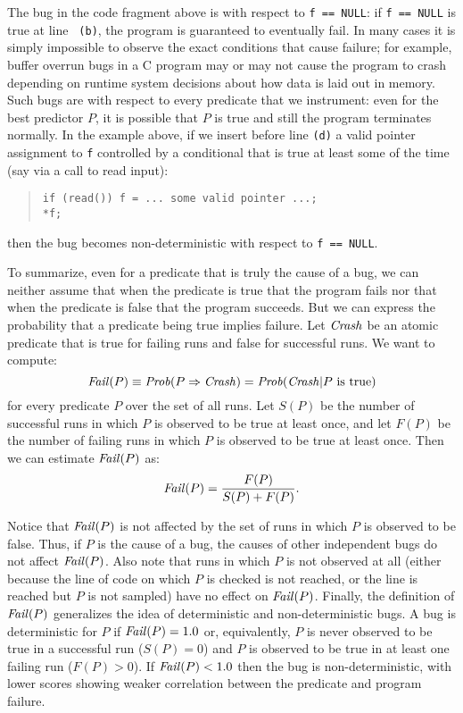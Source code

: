 The bug in the code fragment above is  with
respect to {\tt f == NULL}: if {\tt f == NULL} is true at line {\tt
(b)}, the program is guaranteed to eventually fail.  In many cases it
is simply impossible to observe the exact conditions that cause
failure; for example, buffer overrun bugs in a C program may or may
not cause the program to crash depending on runtime system decisions
about how data is laid out in memory.  Such bugs are
 with respect to every predicate that we instrument:
even for the best predictor $P$, it is possible that $P$ is true and
still the program terminates normally.  In the example above, if we insert before line
{\tt (d)} a valid pointer  assignment to {\tt f} controlled by a conditional that is true
at least some of the time (say via a call to read input):
\begin{quote}
\begin{verbatim}
if (read()) f = ... some valid pointer ...;
*f;
\end{verbatim}
\end{quote}
then the bug becomes non-deterministic with respect to {\tt f == NULL}.

To summarize, even for a predicate that is truly the cause of a bug, we can neither assume that
when the predicate is true that
the program fails nor that when the predicate is false that
the program succeeds. But we can express the probability that a predicate
being true implies failure.  Let $\mbox{\textit{Crash}}$ be an atomic predicate that is
true for failing runs and false for successful runs.  We want to compute:
\[ \mbox{\textit{Fail}}(P) \equiv \mbox{\textit{Prob}}(P \Rightarrow \mbox{\textit{Crash}}) = \mbox{\textit{Prob}}(\mbox{\textit{Crash}} | P \mbox{ is true}) \]
for every predicate $P$ over the set of all runs.  Let $S(P)$ be the number
of successful runs in which $P$ is observed to be true at least once, and let $F(P)$ be the number of
failing runs in which $P$ is observed to be true at least once.  Then we can
estimate $\mbox{\textit{Fail}}(P)$ as:
\[ \mbox{\textit{Fail}}(P) = \frac{F(P)}{S(P) + F(P)} . \]

Notice that $\mbox{\textit{Fail}}(P)$ is not affected by the set of runs in which
$P$ is observed to be false.  Thus, if $P$ is the cause of a bug, the
causes of other independent bugs do not affect $\mbox{\textit{Fail}}(P)$.
Also note that runs in which $P$ is not observed at all (either because
the line of code on which $P$ is checked is not reached, or the line is reached
but $P$ is not sampled) have no effect on $\mbox{\textit{Fail}}(P)$.
Finally, the definition of $\mbox{\textit{Fail}}(P)$
generalizes the idea of deterministic and non-deterministic bugs.  A
bug is deterministic for $P$ if $\mbox{\textit{Fail}}(P) = 1.0$ or, equivalently,
$P$ is never observed to be true in a successful run ($S(P) =
0$) and $P$ is observed to be true in at least one failing run ($F(P) > 0$).
If $\mbox{\textit{Fail}}(P) < 1.0$ then the bug is non-deterministic, with
lower scores showing weaker correlation between the predicate and
program failure.

